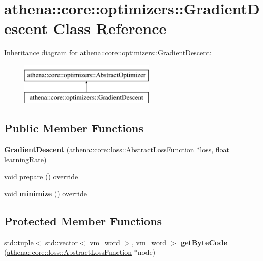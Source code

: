\hypertarget{classathena_1_1core_1_1optimizers_1_1_gradient_descent}{}\section{athena\+:\+:core\+:\+:optimizers\+:\+:Gradient\+Descent Class Reference}
\label{classathena_1_1core_1_1optimizers_1_1_gradient_descent}
Inheritance diagram for athena\+:\+:core\+:\+:optimizers\+:\+:Gradient\+Descent\+:\begin{figure}[H]
\begin{center}
\leavevmode
\includegraphics[height=2.000000cm]{dd/d53/classathena_1_1core_1_1optimizers_1_1_gradient_descent}
\end{center}
\end{figure}
\subsection*{Public Member Functions}
\begin{DoxyCompactItemize}
\item 
\mbox{\label{classathena_1_1core_1_1optimizers_1_1_gradient_descent_a1f81ba3b4a6291f37a33f7eb903ecdfe}} 
{\bfseries Gradient\+Descent} (\mbox{\hyperlink{classathena_1_1core_1_1loss_1_1_abstract_loss_function}{athena\+::core\+::loss\+::\+Abstract\+Loss\+Function}} $\ast$loss, float learning\+Rate)
\item 
void \mbox{\hyperlink{classathena_1_1core_1_1optimizers_1_1_gradient_descent_ab9ecd3b02a82c86bfaaa3d93789d2d5a}{prepare}} () override
\item 
\mbox{\label{classathena_1_1core_1_1optimizers_1_1_gradient_descent_a1403aaa8543b4f50e783ae19b26e2ea4}} 
void {\bfseries minimize} () override
\end{DoxyCompactItemize}
\subsection*{Protected Member Functions}
\begin{DoxyCompactItemize}
\item 
\mbox{\label{classathena_1_1core_1_1optimizers_1_1_gradient_descent_a2d996ac91138589c94da1628dfbb1295}} 
std\+::tuple$<$ std\+::vector$<$ vm\+\_\+word $>$, vm\+\_\+word $>$ {\bfseries get\+Byte\+Code} (\mbox{\hyperlink{classathena_1_1core_1_1loss_1_1_abstract_loss_function}{athena\+::core\+::loss\+::\+Abstract\+Loss\+Function}} $\ast$node)
\end{DoxyCompactItemize}
